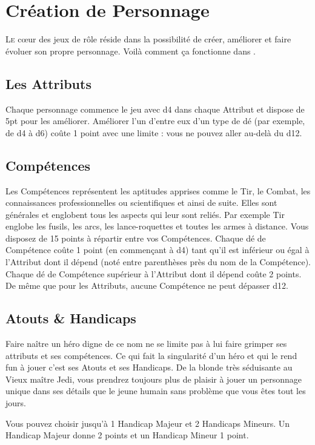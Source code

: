 
\section{Création de Personnage}
\lettrine{L}{e} c\oe{}ur des jeux de rôle réside dans la possibilité de créer, améliorer et faire évoluer son propre personnage. Voilà comment ça fonctionne dans {\jedifont \doctitle}. 

\subsection{Les Attributs}
Chaque personnage commence le jeu avec d4 dans chaque Attribut et dispose de 5pt pour les améliorer. Améliorer l’un d’entre eux d’un type de dé (par exemple, de d4 à d6) coûte 1 point avec une limite : vous ne pouvez aller au-delà du d12.

\subsection{Compétences}
Les Compétences représentent les aptitudes apprises comme le Tir, le Combat, les connaissances professionnelles ou scientifiques et ainsi de suite. Elles sont générales et englobent tous les aspects qui leur sont reliés. Par exemple Tir englobe les fusils, les arcs, les lance-roquettes et toutes les armes à distance. Vous disposez de 15 points à répartir entre vos Compétences. Chaque dé de Compétence coûte 1 point (en commençant à d4) tant qu’il est inférieur ou égal à l’Attribut dont il dépend (noté entre parenthèses près du nom de la Compétence). Chaque dé de Compétence supérieur à l’Attribut dont il dépend coûte 2 points. De même que pour les Attributs, aucune Compétence ne peut dépasser d12.

\subsection{Atouts \& Handicaps}
Faire naître un héro digne de ce nom ne se limite pas à lui faire grimper ses attributs et ses compétences. Ce qui fait la singularité d’un héro et qui le rend fun à jouer c’est ses Atouts et ses Handicaps. De la blonde très séduisante au Vieux maître Jedi, vous prendrez toujours plus de plaisir à jouer un personnage unique dans ses détails que le jeune humain sans problème que vous êtes tout les jours.

Vous pouvez choisir jusqu’à 1 Handicap Majeur et 2 Handicaps Mineurs. Un Handicap Majeur donne 2 points et un Handicap Mineur 1 point.

